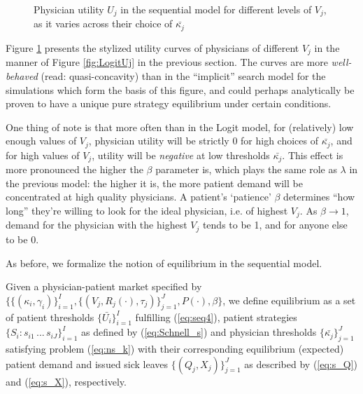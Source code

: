 \documentclass[../main.tex]{subfiles}
\begin{document}
\vspace{-3em}

\begin{figure}[H]
    \centering
    \begin{tikzpicture}[scale=0.6]
    
    \end{tikzpicture}
    \caption{Physician utility $U_j$ in the sequential model for different levels of $V_j$,\\ as it varies across their choice of $\bar{\kappa_j}$}
    \label{fig:SchnellUj}
\end{figure}

Figure \ref{fig:SchnellUj} presents the stylized utility curves of physicians of different $V_j$ in the manner of Figure \ref{fig:LogitUj} in the previous section. The curves are more \textit{well-behaved} (read: quasi-concavity) than in the ``implicit'' search model for the simulations which form the basis of this figure, and could perhaps analytically be proven to have a unique pure strategy equilibrium under certain conditions.

One thing of note is that more often than in the Logit model, for (relatively) low enough values of $V_j$, physician utility will be strictly 0 for high choices of $\bar{\kappa_j}$, and for high values of $V_j$, utility will be \textit{negative} at low thresholds $\bar{\kappa_j}$. This effect is more pronounced the higher the $\beta$ parameter is, which plays the same role as $\lambda$ in the previous model: the higher it is, the more patient demand will be concentrated at high quality physicians. A patient's `patience' $\beta$ determines ``how long'' they're willing to look for the ideal physician, i.e. of highest $V_j$. As $\beta \rightarrow 1$, demand for the physician with the highest $V_j$ tends to be 1, and for anyone else to be 0.

As before, we formalize the notion of equilibrium in the sequential model.

\vspace{0.5em}
\begin{equilibrium}
    \label{Schnell_eq}
Given a physician-patient market specified by $\{\{(\kappa_i,\gamma_i)\}_{i =1}^{I},\{(V_j, R_j(\cdot), \tau_j)\}_{j =1}^{J}, P(\cdot), \beta \}$, we define equilibrium as a set of patient thresholds $\{\bar{U_i}\}_{i =1}^{I}$ fulfilling (\ref{eq:seq4}), patient strategies $\{S_i: s_{i1} \, ... \, s_{iJ}\}_{i =1}^{I}$ as defined by (\ref{eq:Schnell_s}) and physician thresholds $\{\bar{\kappa_j}\}_{j =1}^{J}$ satisfying problem (\ref{eq:ns_k}) with their corresponding equilibrium (expected) patient demand and issued sick leaves $\{(Q_j,X_j)\}_{j =1}^{J}$ as described by (\ref{eq:s_Q}) and (\ref{eq:s_X}), respectively.
\end{equilibrium}
\end{document}

